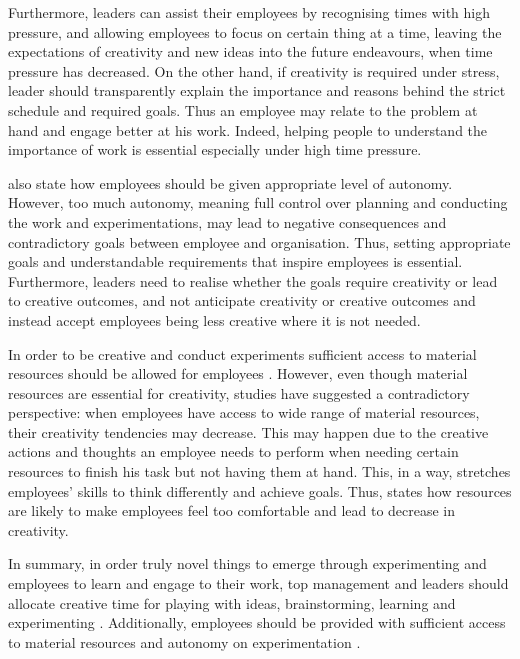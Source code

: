 Furthermore, leaders can assist their employees by recognising times with high pressure, and allowing employees to focus on certain thing at a time, leaving the expectations of creativity and new ideas into the future endeavours, when time pressure has decreased. On the other hand, if creativity is required under stress, leader should transparently explain the importance and reasons behind the strict schedule and required goals. Thus an employee may relate to the problem at hand and engage better at his work. Indeed, helping people to understand the importance of work is essential especially under high time pressure. \citep{amabile2002creativity}

\citet{shalley2004leaders} also state how employees should be given appropriate level of autonomy. However, too much autonomy, meaning full control over planning and conducting the work and experimentations, may lead to negative consequences and contradictory goals between employee and organisation. Thus, setting appropriate goals and understandable requirements that inspire employees is essential. Furthermore, leaders need to realise whether the goals require creativity or lead to creative outcomes, and not anticipate creativity or creative outcomes and instead accept employees being less creative where it is not needed. \citep{shalley2004leaders} 

In order to be creative and conduct experiments sufficient access to material resources should be allowed for employees \citep{katz1985project}. However, even though material resources are essential for creativity, studies have suggested a contradictory perspective: when employees have access to wide range of material resources, their creativity tendencies may decrease. This may happen due to the creative actions and thoughts an employee needs to perform when needing certain resources to finish his task but not having them at hand. This, in a way, stretches employees' skills to think differently and achieve goals. \citep{csikszentmihalyi199916} Thus, \citet{csikszentmihalyi199916} states how resources are likely to make employees feel too comfortable and lead to decrease in creativity. 

In summary, in order truly novel things to emerge through experimenting and employees to learn and engage to their work, top management and leaders should allocate creative time for playing with ideas, brainstorming, learning and experimenting \citep{amabile2002creativity}. Additionally, employees should be provided with sufficient access to material resources \citep{katz1985project} and autonomy on experimentation \citep{shalley2004leaders}. 

